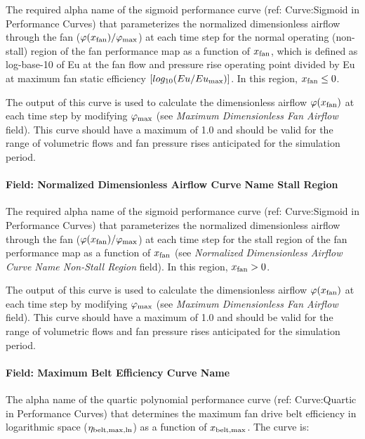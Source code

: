The required alpha name of the sigmoid performance curve (ref: Curve:Sigmoid in Performance Curves) that parameterizes the normalized dimensionless airflow through the fan (\(\varphi (x_{\rm{fan}}) / \varphi_{\rm{max}}\)) at each time step for the normal operating (non-stall) region of the fan performance map as a function of \(x_{\rm{fan}}\), which is defined as log-base-10 of Eu at the fan flow and pressure rise operating point divided by Eu at maximum fan static efficiency \([log_{10}(Eu / Eu_{\rm{max}})]\). In this region, \(x_{\rm{fan}} \le 0\).

The output of this curve is used to calculate the dimensionless airflow \(\varphi (x_{\rm{fan}})\) at each time step by modifying \(\varphi_{\rm{max}}\) (see \emph{Maximum Dimensionless Fan Airflow} field). This curve should have a maximum of 1.0 and should be valid for the range of volumetric flows and fan pressure rises anticipated for the simulation period.

\paragraph{Field: Normalized Dimensionless Airflow Curve Name Stall Region}\label{field-normalized-dimensionless-airflow-curve-name-stall-region}

The required alpha name of the sigmoid performance curve (ref: Curve:Sigmoid in Performance Curves) that parameterizes the normalized dimensionless airflow through the fan (\(\varphi (x_{\rm{fan}}) / \varphi_{\rm{max}}\)) at each time step for the stall region of the fan performance map as a function of \(x_{\rm{fan}}\) (see \emph{Normalized Dimensionless Airflow Curve Name Non-Stall Region} field). In this region, \(x_{\rm{fan}} > 0\).

The output of this curve is used to calculate the dimensionless airflow \(\varphi (x_{\rm{fan}})\) at each time step by modifying \(\varphi_{\rm{max}}\) (see \emph{Maximum Dimensionless Fan Airflow} field). This curve should have a maximum of 1.0 and should be valid for the range of volumetric flows and fan pressure rises anticipated for the simulation period.

\paragraph{Field: Maximum Belt Efficiency Curve Name}\label{field-maximum-belt-efficiency-curve-name}

The alpha name of the quartic polynomial performance curve (ref: Curve:Quartic in Performance Curves) that determines the maximum fan drive belt efficiency in logarithmic space (\(\eta_{\rm{belt, max, ln}}\)) as a function of \(x_{\rm{belt, max}}\). The curve is:

